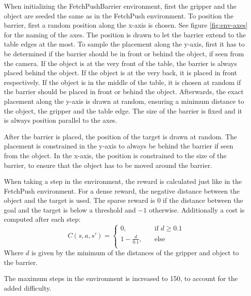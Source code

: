 When initializing the FetchPushBarrier environment, first the gripper and the object are seeded the same as in the FetchPush environment. To position the barrier, first a random position along the x-axis is chosen. See figure \ref{fig:env-axes} for the naming of the axes. The position is drawn to let the barrier extend to the table edges at the most. To sample the placement along the y-axis, first it has to be determined if the barrier should be in front or behind the object, if seen from the camera. If the object is at the very front of the table, the barrier is always placed behind the object. If the object is at the very back, it is placed in front respectively. If the object is in the middle of the table, it is chosen at random if the barrier should be placed in front or behind the object. Afterwards, the exact placement along the y-axis is drawn at random, ensuring a minimum distance to the object, the gripper and the table edge. The size of the barrier is fixed and it is always position parallel to the axes.

After the barrier is placed, the position of the target is drawn at random. The placement is constrained in the y-axis to always be behind the barrier if seen from the object. In the x-axis, the position is constrained to the size of the barrier, to ensure that the object has to be moved around the barrier.

When taking a step in the environment, the reward is calculated just like in the FetchPush environment. For a dense reward, the negative distance between the object and the target is used. The sparse reward is $0$ if the distance between the goal and the target is below a threshold and $-1$ otherwise. Additionally a cost is computed after each step:
\begin{equation}
    C(s,a,s') = \begin{cases}
        0, &\quad\text{if } d \geq 0.1\\
        1-\frac{d}{0.1}, &\quad\text{else}\\
    \end{cases}
\end{equation}
Where $d$ is given by the minimum of the distances of the gripper and object to the barrier.

The maximum steps in the environment is increased to 150, to account for the added difficulty.


